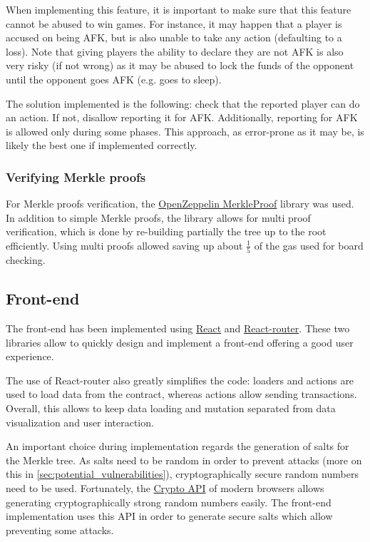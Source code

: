 When implementing this feature, it is important to make sure that this feature
cannot be abused to win games. For instance, it may happen that a player is
accused on being AFK, but is also unable to take any action (defaulting to a
loss). Note that giving players the ability to declare they are not AFK is also
very risky (if not wrong) as it may be abused to lock the funds of the opponent
until the opponent goes AFK (e.g. goes to sleep).

The solution implemented is the following: check that the reported player can
do an action. If not, disallow reporting it for AFK. Additionally, reporting
for AFK is allowed only during some phases. This approach, as error-prone as it
may be, is likely the best one if implemented correctly.

\subsubsection{Verifying Merkle proofs}
For Merkle proofs verification, the
\href{https://docs.openzeppelin.com/contracts/4.x/api/utils\#MerkleProof}{\color{blue}OpenZeppelin
	MerkleProof} library was used. In addition to simple Merkle proofs, the library
allows for multi proof verification, which is done by re-building partially the
tree up to the root efficiently. Using multi proofs allowed saving up about
$\frac{1}{5}$ of the gas used for board checking.

\subsection{Front-end}
\label{sec:implementation-front-end}
The front-end has been implemented using \href{https://react.dev/}{\color{blue}
	React} and \href{https://reactrouter.com/en/main}{\color{blue} React-router}.
These two libraries allow to quickly design and implement a front-end offering
a good user experience.

The use of React-router also greatly simplifies the code: loaders and actions
are used to load data from the contract, whereas actions allow sending
transactions. Overall, this allows to keep data loading and mutation separated
from data visualization and user interaction.

An important choice during implementation regards the generation of salts for
the Merkle tree. As salts need to be random in order to prevent attacks (more
on this in \cref{sec:potential_vulnerabilities}), cryptographically secure
random numbers need to be used. Fortunately, the
\href{https://developer.mozilla.org/en-US/docs/Web/API/Crypto}{\color{blue}Crypto
	API} of modern browsers allows generating cryptographically strong random
numbers easily. The front-end implementation uses this API in order to generate
secure salts which allow preventing some attacks.

